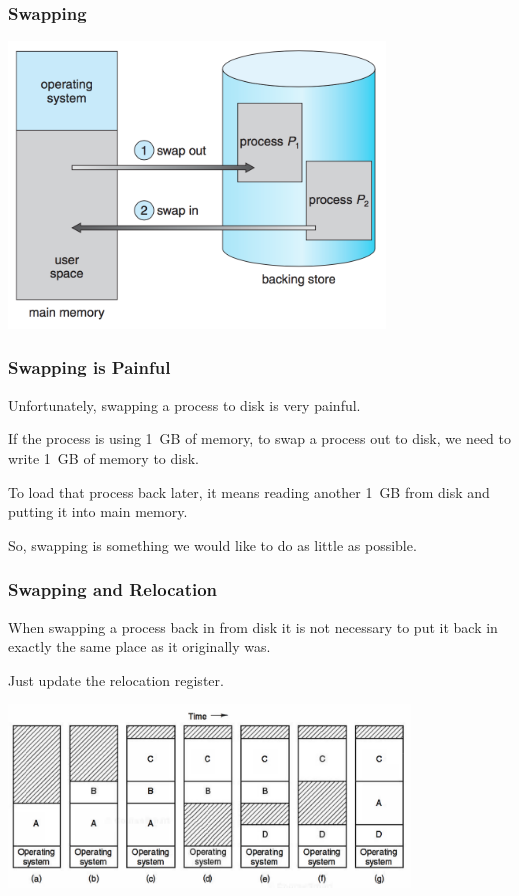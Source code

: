 \begin{frame}
\frametitle{Swapping}
\begin{center}
\includegraphics[width=0.75\textwidth]{images/swapping1.png}
\end{center}


\end{frame}

\begin{frame}
\frametitle{Swapping is Painful}

Unfortunately, swapping a process to disk is very painful. 

If the process is using 1~GB of memory, to swap a process out to disk, we need to write 1~GB of memory to disk. 

To load that process back later, it means reading another 1~GB from disk and putting it into main memory.
 
So, swapping is something we would like to do as little as possible.

\end{frame}

\begin{frame}
\frametitle{Swapping and Relocation}

When swapping a process back in from disk it is not necessary to put it back in exactly the same place as it originally was.

Just update the relocation register.

\begin{center}
\includegraphics[width=0.8\textwidth]{images/swapping2.png}
\end{center}

\end{frame}

